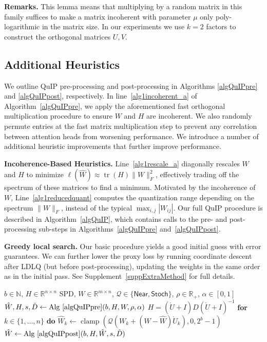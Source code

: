 \textbf{Remarks.} This lemma means that multiplying by a random matrix in this family suffices to make a matrix incoherent with parameter $\mu$ only poly-logarithmic in the matrix size. In our experiments we use $k=2$ factors to construct the orthogonal matrices $U, V$.

\subsection{Additional Heuristics}\label{secAddHeur}
We outline QuIP pre-processing and post-processing in Algorithms \ref{algQuIPpre} and \ref{algQuIPpost}, respectively. In line~\ref{alg1incoherent_a} of Algorithm~\ref{algQuIPpre}, we apply the aforementioned fast orthogonal multiplication procedure to ensure $W$ and $H$ are incoherent. We also randomly permute entries at the fast matrix multiplication step to prevent any correlation between attention heads from worsening performance. We introduce a number of additional heuristic improvements that further improve performance.

\textbf{Incoherence-Based Heuristics.}
Line~\ref{alg1rescale_a} diagonally rescales $W$ and $H$ to minimize $\ell(\hat W) \approx \operatorname{tr}\left(H\right) \|W\|_F^2$, effectively trading off the spectrum of these matrices to find a minimum. Motivated by the incoherence of $W$, Line~\ref{alg1reducedquant} computes the quantization range depending on the spectrum $\|W\|_F$, instead of the typical $\max_{i,j} |W_{ij}|$. Our full QuIP procedure is described in Algorithm~\ref{algQuIP}, which contains calls to the pre- and post-processing sub-steps in Algorithms~\ref{algQuIPpre} and~\ref{algQuIPpost}.

\textbf{Greedy local search.} Our basic procedure yields a good initial guess with error guarantees. We can further lower the proxy loss by running coordinate descent after LDLQ (but before post-processing), updating the weights in the same order as in the initial pass. See Supplement~\ref{suppExtraMethod} for full details.

\begin{algorithm}[t]
\caption{QuIP: Quantization with Incoherence Processing}\label{algQuIP}
\begin{algorithmic}[1]
\Require $b \in \mathbb{N}$, $H \in \mathbb{R}^{n \times n}$ SPD, $W \in \mathbb{R}^{m \times n}$, $\mathcal{Q} \in \{\mathsf{Near}, \mathsf{Stoch}\}$, $\rho \in \mathbb{R}_+$, $\alpha \in [0,1]$
\State $\hat W, H, s, \tilde D \gets \operatorname{Alg~\ref{algQuIPpre}}(b, H, W,  \rho, \alpha)$ 
\State $H = (\grave U + I) D (\grave U + I)^{-1}$ 
\State \textbf{for} $k \in \{1, \dots, n\}$ \textbf{do} 
$\hat W_k \gets \operatorname{clamp}(\mathcal{Q}( W_k + (W - \hat W) \grave U_k ), 0, 2^b-1)$ 
\State \Return $\hat W \gets \operatorname{Alg~\ref{algQuIPpost}}(b, H, \hat W, s, \tilde D)$ 
\end{algorithmic}
\end{algorithm}

